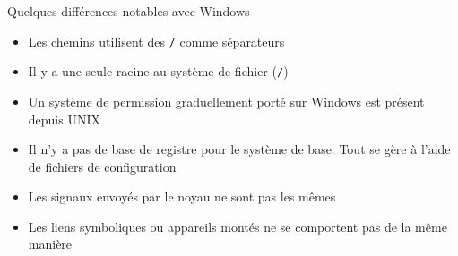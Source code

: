 \begin{frame}{Quelques différences notables avec Windows}
  \begin{itemize}[<+->]
    \item Les chemins utilisent des \texttt{/} comme séparateurs
    \item Il y a une seule racine au système de fichier (\texttt{/})
    \item Un système de permission graduellement porté sur Windows est présent depuis UNIX
    \item Il n'y a pas de base de registre pour le système de base. Tout se gère à l'aide de fichiers de configuration
    \item Les signaux envoyés par le noyau ne sont pas les mêmes
    \item Les liens symboliques ou appareils montés ne se comportent pas de la même manière
  \end{itemize}

\end{frame}
